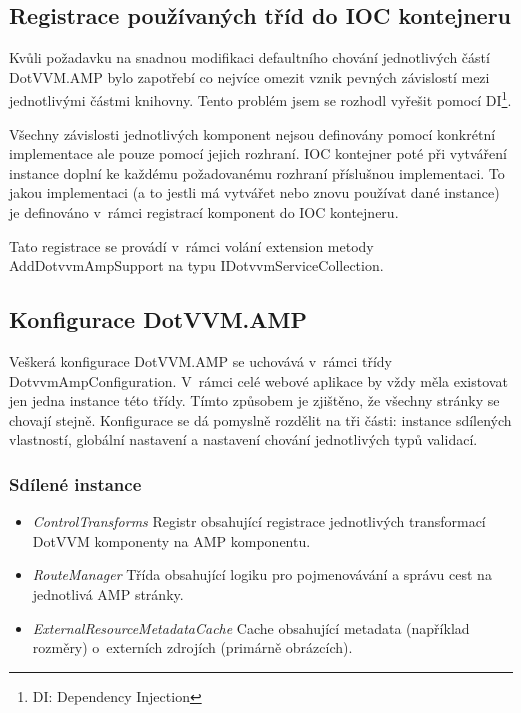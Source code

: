 \subsection*{Registrace používaných tříd do IOC kontejneru}

Kvůli požadavku na snadnou modifikaci defaultního chování jednotlivých částí DotVVM.AMP bylo zapotřebí co nejvíce omezit vznik pevných závislostí mezi jednotlivými částmi knihovny. Tento problém jsem se rozhodl vyřešit pomocí DI\footnote{\label{DI}DI: Dependency Injection}.

Všechny závislosti jednotlivých komponent nejsou definovány pomocí konkrétní implementace ale pouze pomocí jejich rozhraní. IOC kontejner poté při vytváření instance doplní ke každému požadovanému rozhraní příslušnou implementaci. To jakou implementaci (a to jestli má vytvářet nebo znovu používat dané instance) je definováno v~rámci registrací komponent do IOC kontejneru.

Tato registrace se provádí v~rámci volání extension metody AddDotvvmAmpSupport na typu IDotvvmServiceCollection.

\subsection*{Konfigurace DotVVM.AMP}
Veškerá konfigurace DotVVM.AMP se uchovává v~rámci třídy DotvvmAmpConfiguration. V~rámci celé webové aplikace by vždy měla existovat jen jedna instance této třídy. Tímto způsobem je zjištěno, že všechny stránky se chovají stejně. Konfigurace se dá pomyslně rozdělit na tři části: instance sdílených vlastností, globální nastavení a nastavení chování jednotlivých typů validací.

\subsubsection{Sdílené instance}
\begin{itemize}
    \item \textit{ControlTransforms} \newline
Registr obsahující registrace jednotlivých transformací DotVVM komponenty na AMP komponentu.
    \item \textit{RouteManager}\newline
Třída obsahující logiku pro pojmenovávání a správu cest na jednotlivá AMP stránky.
    \item \textit{ExternalResourceMetadataCache}\newline
Cache obsahující metadata (například rozměry) o~externích zdrojích (primárně obrázcích).
\end{itemize}


